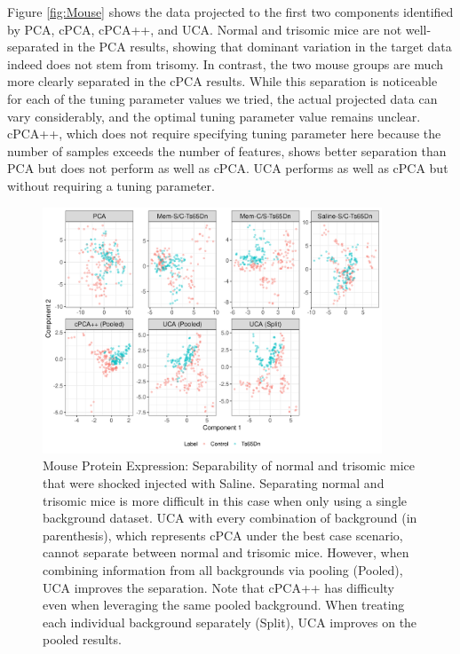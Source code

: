 \documentclass[12pt]{article}
\begin{document}
Figure \ref{fig:Mouse} shows the data projected to the first two components identified by PCA, cPCA, cPCA++, and UCA. Normal and trisomic mice are not well-separated in the PCA results, showing that dominant variation in the target data indeed does not stem from trisomy. In contrast, the two mouse groups are much more clearly separated in the cPCA results. While this separation is noticeable for each of the tuning parameter values we tried, the actual projected data can vary considerably, and the optimal tuning parameter value remains unclear.
cPCA++, which does not require specifying tuning parameter here because the number of samples exceeds the number of features, shows better separation than PCA but does not perform as well as cPCA. UCA performs as well as cPCA but without requiring a tuning parameter.

\begin{figure}[th!]
  \centering
  \includegraphics[width = 0.9\textwidth]{figure/Mouse_split_stack_Ts65Dn.png}
  \caption{ Mouse Protein Expression: Separability of normal and trisomic mice that were shocked injected with Saline. Separating normal and trisomic mice is more difficult in this case when only using a single background dataset. UCA with every combination of background (in parenthesis), which represents cPCA under the best case scenario, cannot separate between normal and trisomic mice. However, when combining information from all backgrounds via pooling (Pooled), UCA improves the separation. Note that cPCA++ has difficulty even when leveraging the same pooled background.  When treating each individual background separately (Split), UCA improves on the pooled results.}
  \label{fig:MouseSplitStack}
\end{figure}
\end{document}

